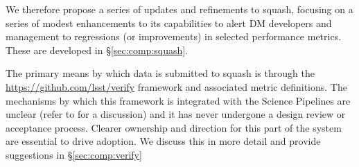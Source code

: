 We therefore propose a series of updates and refinements to \gls{squash},
focusing on a series of modest enhancements to its capabilities to alert DM
developers and management to regressions (or improvements) in selected
performance metrics. These are developed in \S\ref{sec:comp:squash}.

The primary means by which data is submitted to \gls{squash} is through the
\href{lsst.verify}{https://github.com/lsst/verify} framework and associated
metric definitions. The mechanisms by which this framework is integrated with
the Science Pipelines are unclear (refer to  for a
discussion) and it has never undergone a design review or acceptance process.
Clearer ownership and direction for this part of the system are essential to
drive adoption. We discuss this in more detail and provide suggestions in
\S\ref{sec:comp:verify}
